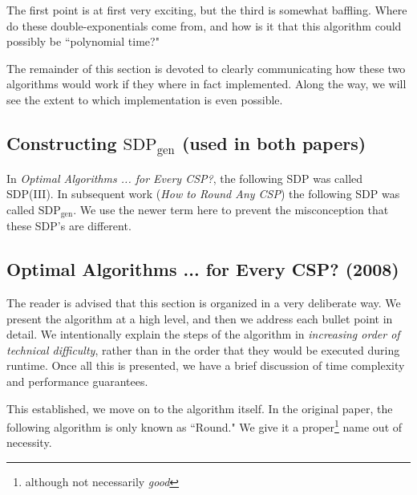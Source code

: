 \documentclass[letterpaper, 12pt]{article}
\numberwithin{equation}{section}
\begin{document}
The first point is at first very exciting, but the third is somewhat baffling. Where do these double-exponentials come from, and how is it that this algorithm could possibly be ``polynomial time?"

The remainder of this section is devoted to clearly communicating how these two algorithms would work if they where in fact implemented. Along the way, we will see the extent to which implementation is even possible.
\subsection{Constructing $\text{SDP}_{\text{gen}}$ (used in both papers)}
In \textit{Optimal Algorithms ... for Every CSP?}, the following SDP was called SDP(III). In subsequent work (\textit{How to Round Any CSP}) the following SDP was called $\text{SDP}_{\text{gen}}$. We use the newer term here to prevent the misconception that these SDP's are different.

\subsection{Optimal Algorithms ... for Every CSP? (2008)}
The reader is advised that this section is organized in a very deliberate way. We present the algorithm at a high level, and then we address each bullet point in detail. We intentionally explain the steps of the algorithm in \textit{increasing order of technical difficulty}, rather than in the order that they would be executed during runtime. Once all this is presented, we have a brief discussion of time complexity and performance guarantees.

This established, we move on to the algorithm itself. In the original paper, the following algorithm is only known as ``Round." We give it a proper\footnote{although not necessarily \textit{good}} name out of necessity.
\end{document}
